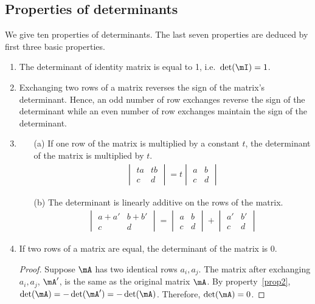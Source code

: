 \documentclass[11pt]{article}
\theoremstyle{plain}
\theoremstyle{definition}
\begin{document}
\subsection{Properties of determinants}
We give ten properties of determinants. The last seven properties are deduced by first three basic properties.
\begin{enumerate}
	\item\label{prop1} The determinant of identity matrix is equal to 1, i.e.\ $\det(\mI) = 1$.
	\item\label{prop2} Exchanging two rows of a matrix reverses the sign of the matrix's determinant. Hence, an odd number of row exchanges reverse the sign of the determinant while an even number of row exchanges maintain the sign of the determinant.
	\item\label{prop3} \begin{enumerate} 
	\item[(a)] If one row of the matrix is multiplied by a constant $t$, the determinant of the matrix is multiplied by $t$.
	\begin{align}
		\begin{vmatrix}
			ta&tb\\c &d 
		\end{vmatrix} = t \begin{vmatrix}
			a&b\\c &d
			\end{vmatrix}
	\end{align} 
	\item[(b)] The determinant is linearly additive on the rows of the matrix.
	\begin{align}
		\begin{vmatrix}
			a+a'&b+b'\\c &d 
		\end{vmatrix} =  \begin{vmatrix}
			a&b\\c &d
			\end{vmatrix} +  \begin{vmatrix}
			a'&b'\\c &d
			\end{vmatrix} 
	\end{align}
	\end{enumerate}

	\item \label{propidenticalrow} If two rows of a matrix are equal, the determinant of the matrix is 0.  
	\begin{proof}
		Suppose $\mA$ has two identical rows $a_i, a_j$. The matrix after exchanging $a_i, a_j$, $\mA'$, is the same as the original matrix $\mA$. By property~\ref{prop2}, $\det(\mA) = -\det(\mA') = -\det(\mA)$. Therefore, $\det(\mA) = 0$.
	\end{proof}


\end{enumerate}
\end{document}
